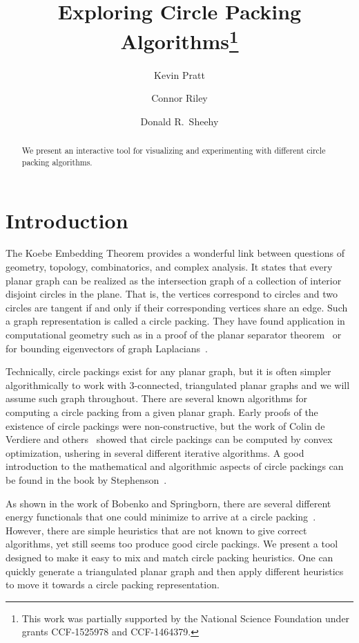 \documentclass[a4paper,UKenglish]{lipics}
\title{Exploring Circle Packing Algorithms\footnote{This work was partially supported by the National Science Foundation under grants CCF-1525978 and CCF-1464379.}}
\author[1]{Kevin Pratt}
\author[2]{Connor Riley}
\author[3]{Donald R.~Sheehy}
\affil[1]{University of Connecticut\\
  \texttt{kevin.pratt@uconn.edu}}
\affil[2]{University of Connecticut\\
  \texttt{connor.riley@uconn.edu}}
\affil[3]{University of Connecticut\\
  \texttt{don.r.sheehy@gmail.com}}
\begin{document}
\maketitle

\begin{abstract}
  We present an interactive tool for visualizing and experimenting with different circle packing algorithms.
\end{abstract}

\section{Introduction} %
\label{sec:introduction}

  The Koebe Embedding Theorem provides a wonderful link between questions of geometry, topology, combinatorics, and complex analysis.
  It states that every planar graph can be realized as the intersection graph of a collection of interior disjoint circles in the plane.
  That is, the vertices correspond to circles and two circles are tangent if and only if their corresponding vertices share an edge.
  Such a graph representation is called a circle packing.
  They have found application in computational geometry such as in a proof of the planar separator theorem~\cite{miller97separators} or for bounding eigenvectors of graph Laplacians~\cite{kelner06spectral}.
  
  Technically, circle packings exist for any planar graph, but it is often simpler algorithmically to work with $3$-connected, triangulated planar graphs and we will assume such graph throughout.
  There are several known algorithms for computing a circle packing from a given planar graph.
  Early proofs of the existence of circle packings were non-constructive, but the work of Colin de Verdiere\cite{colindeverdiere91principe} and others~\cite{mohar93polynomial,bobenko03variational} showed that circle packings can be computed by convex optimization, ushering in several different iterative algorithms.
  A good introduction to the mathematical and algorithmic aspects of circle packings can be found in the book by Stephenson~\cite{stephenson05introduction}.
  
  As shown in the work of Bobenko and Springborn, there are several different energy functionals that one could minimize to arrive at a circle packing~\cite{bobenko03variational}.
  However, there are simple heuristics that are not known to give correct algorithms, yet still seems too produce good circle packings. 
  We present a tool designed to make it easy to mix and match circle packing heuristics. 
  One can quickly generate a triangulated planar graph and then apply different heuristics to move it towards a circle packing representation.
  
\end{document}
